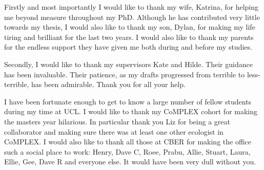 \begin{acknowledgements}



Firstly and most importantly I would like to thank my wife, Katrina, for helping me beyond measure throughout my PhD.
Although he has contributed very little towards my thesis, I would also like to thank my son, Dylan, for making my life tiring and brilliant for the last two years.
I would also like to thank my parents for the endless support they have given me both during and before my studies.



Secondly, I would like to thank my supervisors Kate and Hilde.
Their guidance has been invaluable.
Their patience, as my drafts progressed from terrible to less-terrible, has been admirable.
Thank you for all your help.


I have been fortunate enough to get to know a large number of fellow students during my time at UCL.
I would like to thank my CoMPLEX cohort for making the masters year hilarious.
In particular thank you Liz for being a great collaborator and making sure there was at least one other ecologist in CoMPLEX.
I would also like to thank all those at CBER for making the office such a social place to work: Henry, Dave C, Roee, Prabu, Allie, Stuart, Laura, Ellie, Gee, Dave R and everyone else.
It would have been very dull without you.


\end{acknowledgements}

\setcounter{tocdepth}{2} 

\tableofcontents
\listoffigures
\listoftables

